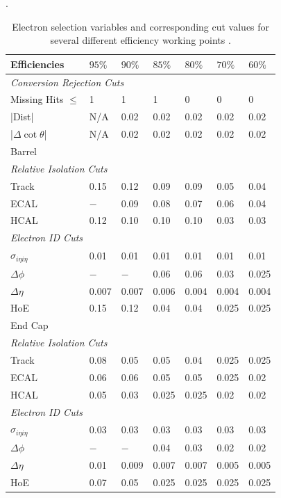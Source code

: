 \cite{nikos,daskalakis2009data}.
\begin{table}[htbp]
  \begin{center}
    \begin{tabular}{lllllll} 
\toprule
Efficiencies& $95\%$& $90\%$& $85\%$& $80\%$& $70\%$& $60\%$\\
\midrule
\multicolumn{7}{l}{\emph{Conversion Rejection Cuts}}\\ 
Missing Hits $\leq$& 1& 1& 1& 0& 0& 0\\
|Dist|& N/A& 0.02& 0.02& 0.02& 0.02& 0.02\\
|$\Delta\cot\theta$|& N/A& 0.02& 0.02& 0.02& 0.02& 0.02\\
\midrule
\multicolumn{7}{l}{Barrel}\\ 
\multicolumn{7}{l}{\emph{Relative Isolation Cuts}} \\
Track    & 0.15& 0.12& 0.09& 0.09& 0.05& 0.04\\
ECAL     & $-$ & 0.09& 0.08& 0.07& 0.06& 0.04\\
HCAL     & 0.12& 0.10& 0.10& 0.10& 0.03& 0.03\\
\multicolumn{7}{l}{\emph{Electron ID Cuts}} \\
$\sigma_{i\eta i\eta}$& 0.01& 0.01& 0.01& 0.01& 0.01& 0.01\\
$\Delta \phi$& $-$ & $-$ & 0.06& 0.06& 0.03& 0.025\\
$\Delta \eta$& 0.007& 0.007& 0.006& 0.004& 0.004& 0.004\\
HoE& 0.15& 0.12& 0.04& 0.04& 0.025& 0.025\\
\midrule
\multicolumn{7}{l}{End Cap}\\ 
\multicolumn{7}{l}{\emph{Relative Isolation Cuts}} \\
Track    & 0.08& 0.05& 0.05& 0.04& 0.025& 0.025\\
ECAL     & 0.06& 0.06& 0.05& 0.05& 0.025& 0.02\\
HCAL     & 0.05& 0.03& 0.025& 0.025& 0.02& 0.02\\
\multicolumn{7}{l}{\emph{Electron ID Cuts}} \\
$\sigma_{i\eta i\eta}$& 0.03& 0.03& 0.03& 0.03& 0.03& 0.03\\
$\Delta \phi$& $-$ & $-$ & 0.04& 0.03& 0.02& 0.02\\
$\Delta \eta$& 0.01& 0.009& 0.007& 0.007& 0.005& 0.005\\
HoE& 0.07& 0.05& 0.025& 0.025& 0.025& 0.025\\
\bottomrule
    \end{tabular}
    \caption{Electron selection variables and
corresponding cut values for several different efficiency working points
\cite{nikos,daskalakis2009data,simplecutbasedeleid}.\label{tab:electronwp} }
  \end{center}
\end{table}


